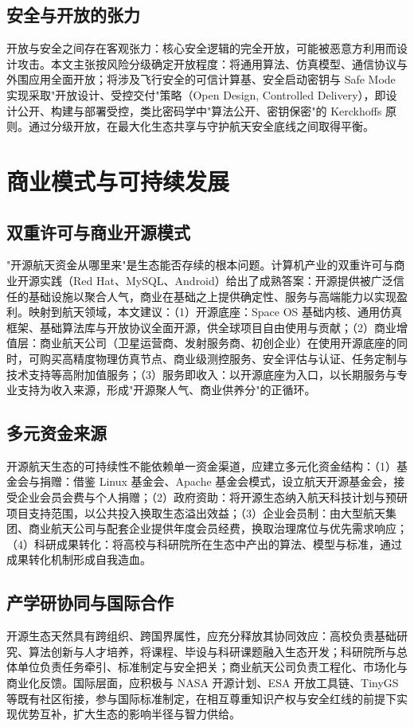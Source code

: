 \documentclass[UTF8,a4paper,zihao=-4]{ctexart}
\begin{document}
\subsection{安全与开放的张力}
开放与安全之间存在客观张力：核心安全逻辑的完全开放，可能被恶意方利用而设计攻击。本文主张按风险分级确定开放程度：将通用算法、仿真模型、通信协议与外围应用全面开放；将涉及飞行安全的可信计算基、安全启动密钥与 Safe Mode 实现采取"开放设计、受控交付"策略（Open Design, Controlled Delivery），即设计公开、构建与部署受控，类比密码学中"算法公开、密钥保密"的 Kerckhoffs 原则。通过分级开放，在最大化生态共享与守护航天安全底线之间取得平衡。

\section{商业模式与可持续发展}
\subsection{双重许可与商业开源模式}
"开源航天资金从哪里来"是生态能否存续的根本问题。计算机产业的双重许可与商业开源实践（Red Hat、MySQL、Android）给出了成熟答案：开源提供被广泛信任的基础设施以聚合人气，商业在基础之上提供确定性、服务与高端能力以实现盈利。映射到航天领域，本文建议：（1）开源底座：Space OS 基础内核、通用仿真框架、基础算法库与开放协议全面开源，供全球项目自由使用与贡献；（2）商业增值层：商业航天公司（卫星运营商、发射服务商、初创企业）在使用开源底座的同时，可购买高精度物理仿真节点、商业级测控服务、安全评估与认证、任务定制与技术支持等高附加值服务；（3）服务即收入：以开源底座为入口，以长期服务与专业支持为收入来源，形成"开源聚人气、商业供养分"的正循环。

\subsection{多元资金来源}
开源航天生态的可持续性不能依赖单一资金渠道，应建立多元化资金结构：（1）基金会与捐赠：借鉴 Linux 基金会、Apache 基金会模式，设立航天开源基金会，接受企业会员会费与个人捐赠；（2）政府资助：将开源生态纳入航天科技计划与预研项目支持范围，以公共投入换取生态溢出效益；（3）企业会员制：由大型航天集团、商业航天公司与配套企业提供年度会员经费，换取治理席位与优先需求响应；（4）科研成果转化：将高校与科研院所在生态中产出的算法、模型与标准，通过成果转化机制形成自我造血。

\subsection{产学研协同与国际合作}
开源生态天然具有跨组织、跨国界属性，应充分释放其协同效应：高校负责基础研究、算法创新与人才培养，将课程、毕设与科研课题融入生态开发；科研院所与总体单位负责任务牵引、标准制定与安全把关；商业航天公司负责工程化、市场化与商业化反馈。国际层面，应积极与 NASA 开源计划、ESA 开放工具链、TinyGS 等既有社区衔接，参与国际标准制定，在相互尊重知识产权与安全红线的前提下实现优势互补，扩大生态的影响半径与智力供给。
\end{document}
